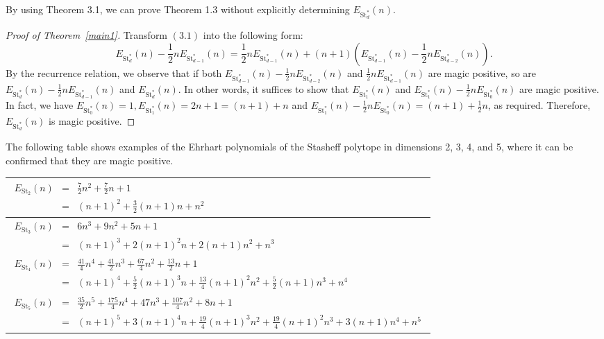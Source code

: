 \documentclass[a4paper,reqno,11pt, oneside]{amsart}
\theoremstyle{definition}
\theoremstyle{remark}
\begin{document}
By using Theorem 3.1, we can prove Theorem 1.3 without explicitly determining $E_{\mathrm{St}_d^\ast}(n)$.
\begin{proof}[Proof of Theorem~\ref{main1}]
Transform $(3.1)$ into the following form$:$
$$E_{\mathrm{St}_d^\ast}(n) - \frac{1}{2}nE_{\mathrm{St}_{d-1}^\ast}(n) = \frac{1}{2}nE_{\mathrm{St}_{d-1}^\ast}(n) + (n+1)\left(E_{\mathrm{St}_{d-1}^\ast}(n) - \frac{1}{2}nE_{\mathrm{St}_{d-2}^\ast}(n)\right).$$
By the recurrence relation, we observe that if both $E_{\mathrm{St}_{d-1}^\ast}(n) - \frac{1}{2}nE_{\mathrm{St}_{d-2}^\ast}(n)$ and $\frac{1}{2}nE_{\mathrm{St}_{d-1}^\ast}(n)$ are magic positive, so are $E_{\mathrm{St}_d^\ast}(n) - \frac{1}{2}nE_{\mathrm{St}_{d-1}^\ast}(n)$ and $E_{\mathrm{St}_d^\ast}(n)$. In other words, it suffices to show that $E_{\mathrm{St}_1^\ast}(n) $ and $E_{\mathrm{St}_1^\ast}(n) - \frac{1}{2}nE_{\mathrm{St}_0^\ast}(n)$ are magic positive. 
In fact, we have $E_{\mathrm{St}_0^\ast}(n) = 1, E_{\mathrm{St}_1^\ast}(n) = 2n+1 = (n+1) + n$ and $E_{\mathrm{St}_1^\ast}(n) - \frac{1}{2}nE_{\mathrm{St}_0^\ast}(n) = (n+1) + \frac{1}{2}n$, as required. Therefore, $E_{\mathrm{St}_d^\ast}(n)$ is magic positive.
\end{proof}

The following table shows examples of the Ehrhart polynomials of the Stasheff polytope in dimensions 2, 3, 4, and 5, where it can be confirmed that they are magic positive.

\begin{table}[h]
  \centering
  \renewcommand{\arraystretch}{1.3}
  \begin{tabular}{|l|}
     \hline
      $\begin{array}{rcl}
      E_{\mathrm{St}_2}(n) & = & \frac{7}{2}n^2 + \frac{7}{2}n + 1 \\
        & = & (n+1)^2 + \frac{3}{2}(n+1)n + n^2
      \end{array}$ \\ \hline
      $\begin{array}{rcl}
      E_{\mathrm{St}_3}(n) & = & 6n^3 + 9n^2 + 5n + 1 \\
        & = & (n+1)^3 + 2(n+1)^2n + 2(n+1)n^2 + n^3
      \end{array}$ \\ \hline
      $\begin{array}{rcl}
      E_{\mathrm{St}_4}(n) & = & \frac{41}{4}n^4 + \frac{41}{2}n^3 + \frac{67}{4}n^2 + \frac{13}{2}n + 1 \\
        & = & (n+1)^4 + \frac{5}{2}(n+1)^3n + \frac{13}{4}(n+1)^2n^2 + \frac{5}{2}(n+1)n^3 + n^4
      \end{array}$ \\ \hline
      $\begin{array}{rcl}
      E_{\mathrm{St}_5}(n) & = & \frac{35}{2}n^5 + \frac{175}{4}n^4 + 47n^3 + \frac{107}{4}n^2 + 8n + 1 \\
        & = & (n+1)^5 + 3(n+1)^4n + \frac{19}{4}(n+1)^3n^2 + \frac{19}{4}(n+1)^2n^3 + 3(n+1)n^4 + n^5
      \end{array}$ \\ \hline
  \end{tabular}
\end{table}
\end{document}

